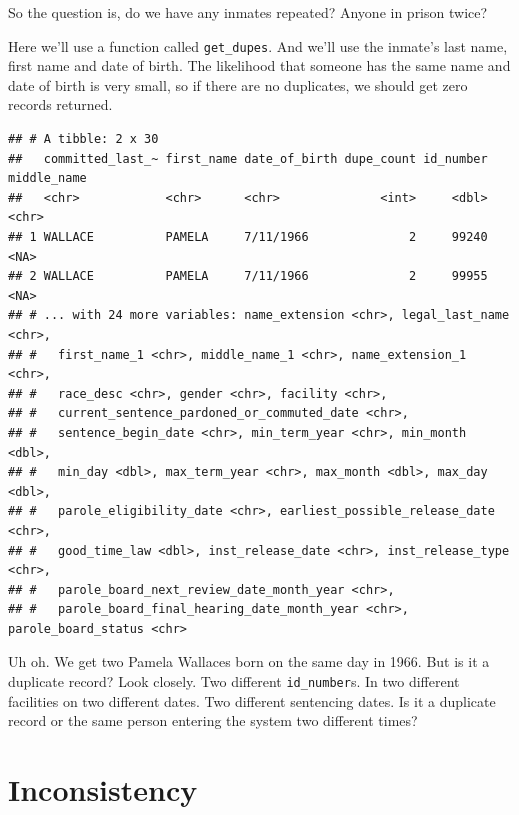 \documentclass[]{book}
\newenvironment{Shaded}{\begin{snugshade}}{\end{snugshade}}
\newcommand{\KeywordTok}[1]{\textcolor[rgb]{0.13,0.29,0.53}{\textbf{#1}}}
\newcommand{\NormalTok}[1]{#1}
\newcommand{\OperatorTok}[1]{\textcolor[rgb]{0.81,0.36,0.00}{\textbf{#1}}}
\newcommand{\StringTok}[1]{\textcolor[rgb]{0.31,0.60,0.02}{#1}}
\begin{document}
So the question is, do we have any inmates repeated? Anyone in prison twice?

Here we'll use a function called \texttt{get\_dupes}. And we'll use the inmate's last name, first name and date of birth. The likelihood that someone has the same name and date of birth is very small, so if there are no duplicates, we should get zero records returned.

\begin{Shaded}
\end{Shaded}

\begin{verbatim}
## # A tibble: 2 x 30
##   committed_last_~ first_name date_of_birth dupe_count id_number middle_name
##   <chr>            <chr>      <chr>              <int>     <dbl> <chr>      
## 1 WALLACE          PAMELA     7/11/1966              2     99240 <NA>       
## 2 WALLACE          PAMELA     7/11/1966              2     99955 <NA>       
## # ... with 24 more variables: name_extension <chr>, legal_last_name <chr>,
## #   first_name_1 <chr>, middle_name_1 <chr>, name_extension_1 <chr>,
## #   race_desc <chr>, gender <chr>, facility <chr>,
## #   current_sentence_pardoned_or_commuted_date <chr>,
## #   sentence_begin_date <chr>, min_term_year <chr>, min_month <dbl>,
## #   min_day <dbl>, max_term_year <chr>, max_month <dbl>, max_day <dbl>,
## #   parole_eligibility_date <chr>, earliest_possible_release_date <chr>,
## #   good_time_law <dbl>, inst_release_date <chr>, inst_release_type <chr>,
## #   parole_board_next_review_date_month_year <chr>,
## #   parole_board_final_hearing_date_month_year <chr>, parole_board_status <chr>
\end{verbatim}

Uh oh. We get two Pamela Wallaces born on the same day in 1966. But is it a duplicate record? Look closely. Two different \texttt{id\_number}s. In two different facilities on two different dates. Two different sentencing dates. Is it a duplicate record or the same person entering the system two different times?

\hypertarget{inconsistency}{%
\section{Inconsistency}\label{inconsistency}}
\end{document}
